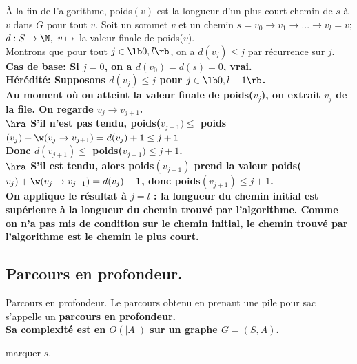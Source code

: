 \documentclass[french, 11pt]{article}
\begin{document}
\vspace*{-0.8cm}

\begin{thm}{}{}
    À la fin de l'algorithme, poids$(v)$ est la longueur d'un plus court chemin de $s$ à $v$ dans $G$ pour tout $v$.
    \tcblower
    Soit un sommet $v$ et un chemin $s=v_0\to v_1 \to ... \to v_l = v$; $d: S \to \N, ~ v\mapsto$ la valeur finale de poids($v$).\\
    Montrons que pour tout $j\in\lb0,l\rb$, on a $d(v_j)\leq j$ par récurrence sur $j$.\\
    \bf{Cas de base:} Si $j=0$, on a $d(v_0)=d(s)=0$, vrai.\\
    \bf{Hérédité:} Supposons $d(v_j)\leq j$ pour $j\in\lb0,l-1\rb$.\\
    Au moment où on atteint la valeur finale de poids($v_j$), on extrait $v_j$ de la file. On regarde $v_j\to v_{j+1}$.\\
    $\hra$ S'il n'est pas tendu, poids($v_{j+1}) \leq $ poids$(v_j)+\w(v_j\to v_{j+1})=d(v_j)+1\leq j+1$\\
    Donc $d(v_{j+1})\leq$ poids($v_{j+1}) \leq j+1$.\\
    $\hra$ S'il est tendu, alors poids$(v_{j+1})$ prend la valeur poids($v_j)+\w(v_j\to v_{j+1})=d(v_j)+1$, donc poids$(v_{j+1})\leq j+1$.\\
    On applique le résultat à $j=l$ : la longueur du chemin initial est supérieure à la longueur du chemin trouvé par l'algorithme. Comme on n'a pas mis de condition sur le chemin initial, le chemin trouvé par l'algorithme est le chemin le plus court.
\end{thm}

\subsection{Parcours en profondeur.}

\begin{defi}{Parcours en profondeur.}{}
    Le parcours obtenu en prenant une pile pour sac s'appelle un \bf{parcours en profondeur.}\\
    Sa complexité est en $O(|A|)$ sur un graphe $G=(S,A)$.\n
    \hspace*{0.28cm}\begin{algorithm}[H]
        \LinesNumbered
        \caption{Parcours en profondeur récursif.}
        marquer $s$.\\
    \end{algorithm}
\end{defi}
\end{document}
